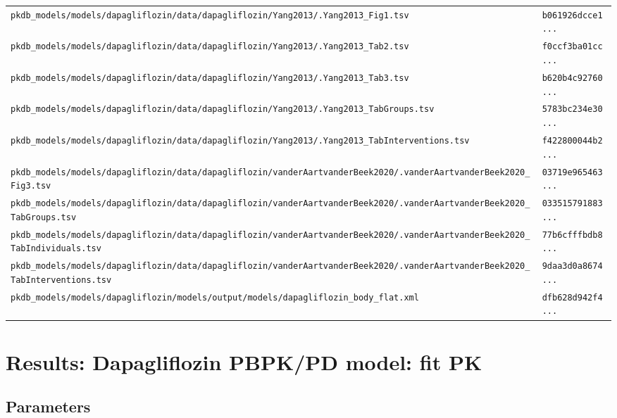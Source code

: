 \documentclass{article}
\begin{document}
\begin{longtable}{ll}
\texttt{pkdb\_models/models/dapagliflozin/data/dapagliflozin/Yang2013/.Yang2013\_Fig1.tsv} & \texttt{b061926dcce1...} \\
\texttt{pkdb\_models/models/dapagliflozin/data/dapagliflozin/Yang2013/.Yang2013\_Tab2.tsv} & \texttt{f0ccf3ba01cc...} \\
\texttt{pkdb\_models/models/dapagliflozin/data/dapagliflozin/Yang2013/.Yang2013\_Tab3.tsv} & \texttt{b620b4c92760...} \\
\texttt{pkdb\_models/models/dapagliflozin/data/dapagliflozin/Yang2013/.Yang2013\_TabGroups.tsv} & \texttt{5783bc234e30...} \\
\texttt{pkdb\_models/models/dapagliflozin/data/dapagliflozin/Yang2013/.Yang2013\_TabInterventions.tsv} & \texttt{f422800044b2...} \\
\texttt{pkdb\_models/models/dapagliflozin/data/dapagliflozin/vanderAartvanderBeek2020/.vanderAartvanderBeek2020\_Fig3.tsv} & \texttt{03719e965463...} \\
\texttt{pkdb\_models/models/dapagliflozin/data/dapagliflozin/vanderAartvanderBeek2020/.vanderAartvanderBeek2020\_TabGroups.tsv} & \texttt{033515791883...} \\
\texttt{pkdb\_models/models/dapagliflozin/data/dapagliflozin/vanderAartvanderBeek2020/.vanderAartvanderBeek2020\_TabIndividuals.tsv} & \texttt{77b6cfffbdb8...} \\
\texttt{pkdb\_models/models/dapagliflozin/data/dapagliflozin/vanderAartvanderBeek2020/.vanderAartvanderBeek2020\_TabInterventions.tsv} & \texttt{9daa3d0a8674...} \\
\texttt{pkdb\_models/models/dapagliflozin/models/output/models/dapagliflozin\_body\_flat.xml} & \texttt{dfb628d942f4...} \\
\end{longtable}

\section{Results: Dapagliflozin PBPK/PD model: fit PK}

\subsection{Parameters}
\end{document}
